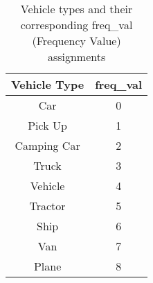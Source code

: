 \begin{table}[h!]
\centering
\begin{tabular}{c|c}
\hline
\textbf{Vehicle Type} & \textbf{freq\_val} \\
\hline
Car & 0 \\
Pick Up & 1 \\
Camping Car & 2 \\
Truck & 3 \\
Vehicle & 4 \\
Tractor & 5 \\
Ship & 6 \\
Van & 7 \\
Plane & 8 \\
\hline
\end{tabular}
\caption{Vehicle types and their corresponding freq\_val (Frequency Value) assignments}
\label{tab:class_freq_val}
\end{table}







